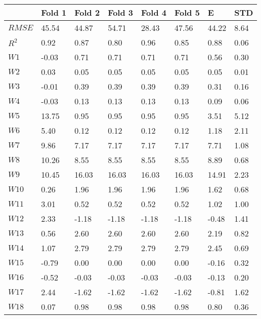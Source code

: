 \documentclass{article}
\begin{document}
\begin{longtable}{llllllll}
    \toprule
            &	Fold 1  &   Fold 2 & Fold 3  & Fold 4 & Fold 5   & E & STD   \\
    \midrule
    $RMSE$  &   45.54  & 44.87  & 54.71  & 28.43  & 47.56  & 44.22  & 8.64  \\
    $R^2$   &   0.92   & 0.87   & 0.80   & 0.96   & 0.85   & 0.88   & 0.06  \\
    $W1$    &   -0.03  & 0.71   & 0.71   & 0.71   & 0.71   & 0.56   & 0.30  \\
    $W2$    &   0.03   & 0.05   & 0.05   & 0.05   & 0.05   & 0.05   & 0.01  \\
    $W3$    &   -0.01  & 0.39   & 0.39   & 0.39   & 0.39   & 0.31   & 0.16  \\
    $W4$    &   -0.03  & 0.13   & 0.13   & 0.13   & 0.13   & 0.09   & 0.06  \\
    $W5$    &   13.75  & 0.95   & 0.95   & 0.95   & 0.95   & 3.51   & 5.12  \\
    $W6$    &   5.40   & 0.12   & 0.12   & 0.12   & 0.12   & 1.18   & 2.11  \\
    $W7$    &   9.86   & 7.17   & 7.17   & 7.17   & 7.17   & 7.71   & 1.08  \\
    $W8$    &   10.26  & 8.55   & 8.55   & 8.55   & 8.55   & 8.89   & 0.68  \\
    $W9$    &   10.45  & 16.03  & 16.03  & 16.03  & 16.03  & 14.91  & 2.23  \\
    $W10$    &   0.26   & 1.96   & 1.96   & 1.96   & 1.96   & 1.62   & 0.68  \\
    $W11$    &   3.01   & 0.52   & 0.52   & 0.52   & 0.52   & 1.02   & 1.00  \\
    $W12$    &   2.33   & -1.18  & -1.18  & -1.18  & -1.18  & -0.48  & 1.41  \\
    $W13$    &   0.56   & 2.60   & 2.60   & 2.60   & 2.60   & 2.19   & 0.82  \\
    $W14$    &   1.07   & 2.79   & 2.79   & 2.79   & 2.79   & 2.45   & 0.69  \\
    $W15$    &   -0.79  & 0.00   & 0.00   & 0.00   & 0.00   & -0.16  & 0.32  \\
    $W16$    &   -0.52  & -0.03  & -0.03  & -0.03  & -0.03  & -0.13  & 0.20  \\
    $W17$    &   2.44   & -1.62  & -1.62  & -1.62  & -1.62  & -0.81  & 1.62  \\
    $W18$    &   0.07   & 0.98   & 0.98   & 0.98   & 0.98   & 0.80   & 0.36  \\

\end{longtable}
\end{document}
